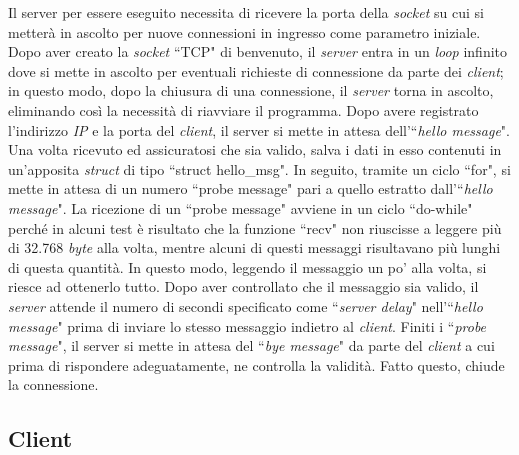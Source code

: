 \documentclass[a4paper, 12pt]{report}
\begin{document}
Il server per essere eseguito necessita di ricevere la porta della \textit{socket} su cui si metterà in ascolto per nuove connessioni in ingresso
come parametro iniziale.\newline
Dopo aver creato la \textit{socket} ``TCP" di benvenuto, il \textit{server} entra in un \textit{loop} infinito dove si mette in ascolto per eventuali
richieste di connessione da parte dei \textit{client}; in questo modo, dopo la chiusura di una connessione, il \textit{server} torna in ascolto,
eliminando così la necessità di riavviare il programma.\newline
Dopo avere registrato l'indirizzo \textit{IP} e la porta del \textit{client}, il server si mette in attesa dell'``\textit{hello message}". Una volta
ricevuto ed assicuratosi che sia valido, salva i dati in esso contenuti in un'apposita \textit{struct} di tipo ``struct hello\_msg". In seguito,
tramite un ciclo ``for", si mette in attesa di un numero ``probe message" pari a quello estratto dall'``\textit{hello message}". La ricezione di
un ``probe message" avviene in un ciclo ``do-while" perché in alcuni test è risultato che la funzione ``recv" non riuscisse a leggere più di
32.768 \textit{byte} alla volta, mentre alcuni di questi messaggi risultavano più lunghi di questa quantità. In questo modo, leggendo il messaggio 
un po' alla volta, si riesce ad ottenerlo tutto. Dopo aver controllato che
il messaggio sia valido, il \textit{server} attende il numero di secondi specificato come ``\textit{server delay}" nell'``\textit{hello message}"
prima di inviare lo stesso messaggio indietro al \textit{client}.\newline
Finiti i ``\textit{probe message}", il server si mette in attesa del ``\textit{bye message}" da parte del \textit{client} a cui prima di rispondere 
adeguatamente, ne controlla la validità. Fatto questo, chiude la connessione.

\subsection{Client}
\end{document}
